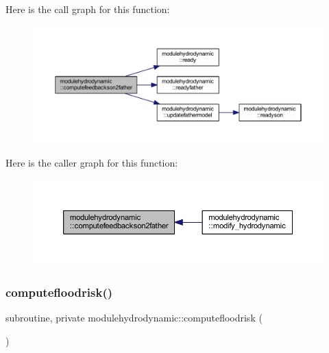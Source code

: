 Here is the call graph for this function\+:\nopagebreak
\begin{figure}[H]
\begin{center}
\leavevmode
\includegraphics[width=350pt]{namespacemodulehydrodynamic_a83eb2d1806304e7bfac59fbf155291e4_cgraph}
\end{center}
\end{figure}
Here is the caller graph for this function\+:\nopagebreak
\begin{figure}[H]
\begin{center}
\leavevmode
\includegraphics[width=350pt]{namespacemodulehydrodynamic_a83eb2d1806304e7bfac59fbf155291e4_icgraph}
\end{center}
\end{figure}
\mbox{\label{namespacemodulehydrodynamic_a3ccbfcaea30af1d03bc8f158f2262081}} 
\subsubsection{\texorpdfstring{computefloodrisk()}{computefloodrisk()}}
{\footnotesize\ttfamily subroutine, private modulehydrodynamic\+::computefloodrisk (\begin{DoxyParamCaption}{ }\end{DoxyParamCaption})\hspace{0.3cm}{\ttfamily [private]}}

